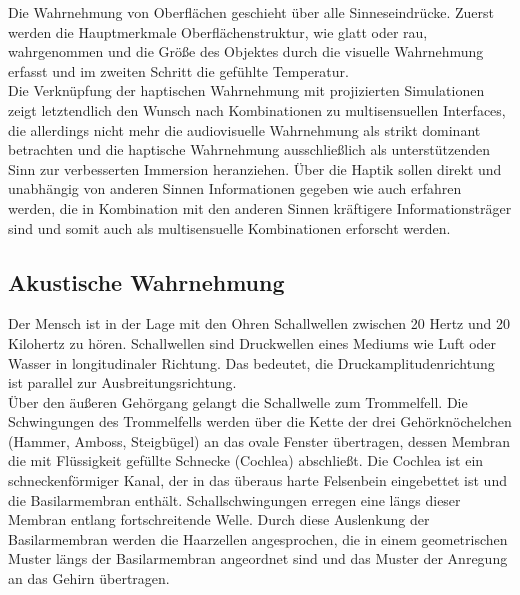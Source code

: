 Die Wahrnehmung von Oberflächen geschieht über alle Sinneseindrücke. Zuerst werden die Hauptmerkmale Oberflächenstruktur, wie glatt oder rau, wahrgenommen und die Größe des Objektes durch die visuelle Wahrnehmung erfasst und im zweiten Schritt die gefühlte Temperatur. \cite[Vgl. Seite 33]{Sprenger.2020}\\
\glqq Die Verknüpfung der haptischen Wahrnehmung mit projizierten Simulationen zeigt letztendlich den Wunsch nach Kombinationen zu multisensuellen Interfaces, die allerdings nicht mehr die audiovisuelle Wahrnehmung als strikt dominant betrachten und die haptische Wahrnehmung ausschließlich als unterstützenden Sinn zur verbesserten Immersion heranziehen. Über die Haptik sollen direkt und unabhängig von anderen Sinnen Informationen gegeben wie auch erfahren werden, die in Kombination mit den anderen Sinnen kräftigere Informationsträger sind und somit auch als multisensuelle Kombinationen erforscht werden. \grqq{} \cite[Seite 263]{Sprenger.2020}
\subsection{Akustische Wahrnehmung}
Der Mensch ist in der Lage mit den Ohren Schallwellen zwischen 20 Hertz und 20 Kilohertz zu hören. Schallwellen sind Druckwellen eines Mediums wie Luft oder Wasser in longitudinaler Richtung. Das bedeutet, die Druckamplitudenrichtung ist parallel zur Ausbreitungsrichtung. \cite[Vgl. Seite 217]{Schonhammer.2013} \\
\glqq Über den äußeren Gehörgang gelangt die Schallwelle zum Trommelfell. Die Schwingungen des Trommelfells werden über die Kette der drei Gehörknöchelchen (Hammer, Amboss, Steigbügel) an das ovale Fenster übertragen, dessen Membran die mit Flüssigkeit gefüllte Schnecke (Cochlea) abschließt. Die Cochlea ist ein schneckenförmiger Kanal, der in das überaus harte Felsenbein eingebettet ist und die Basilarmembran enthält. Schallschwingungen erregen eine längs dieser Membran entlang fortschreitende Welle. Durch diese Auslenkung der Basilarmembran werden die Haarzellen angesprochen, die in einem geometrischen Muster längs der Basilarmembran angeordnet sind und das Muster der Anregung an das Gehirn übertragen. \grqq{} \cite[Seite 71f.]{Bernstein.2019}

